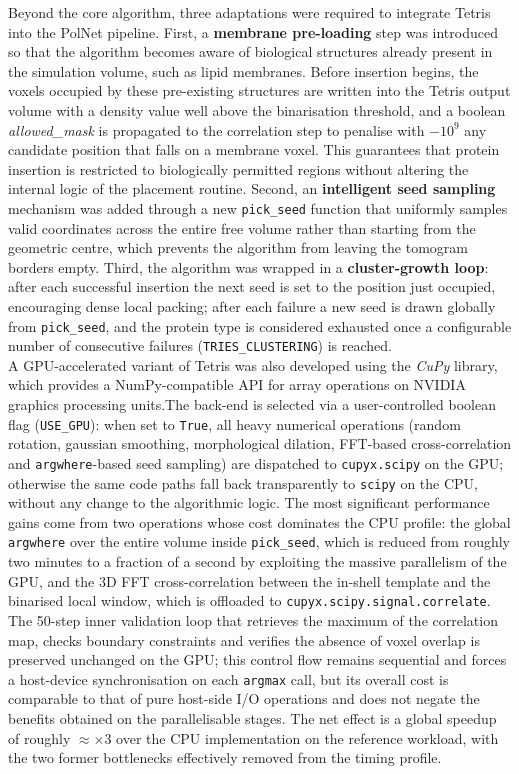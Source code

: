 Beyond the core algorithm, three adaptations were required to integrate Tetris into the
PolNet pipeline. First, a \textbf{membrane pre-loading} step was introduced so that the
algorithm becomes aware of biological structures already present in the simulation volume,
such as lipid membranes. Before insertion begins, the voxels occupied by these
pre-existing structures are written into the Tetris output volume with a density value well
above the binarisation threshold, and a boolean \textit{allowed\_mask} is propagated to the
correlation step to penalise with $-10^{9}$ any candidate position that falls on a membrane
voxel. This guarantees that protein insertion is restricted to biologically permitted regions
without altering the internal logic of the placement routine. Second, an
\textbf{intelligent seed sampling} mechanism was added through a new \texttt{pick\_seed}
function that uniformly samples valid coordinates across the entire free volume rather than
starting from the geometric centre, which prevents the algorithm from leaving the tomogram
borders empty. Third, the algorithm was wrapped in a \textbf{cluster-growth loop}: after each
successful insertion the next seed is set to the position just occupied, encouraging dense
local packing; after each failure a new seed is drawn globally from \texttt{pick\_seed}, and
the protein type is considered exhausted once a configurable number of consecutive failures
(\texttt{TRIES\_CLUSTERING}) is reached.\\

A GPU-accelerated variant of Tetris was also developed using the \textit{CuPy} library,
which provides a NumPy-compatible API for array operations on NVIDIA graphics processing
units.The back-end is selected via a user-controlled boolean flag (\texttt{USE\_GPU}): when set to \texttt{True}, all heavy numerical operations (random rotation, gaussian smoothing,
morphological dilation, FFT-based cross-correlation and \texttt{argwhere}-based seed
sampling) are dispatched to \texttt{cupyx.scipy} on the GPU; otherwise the same code paths
fall back transparently to \texttt{scipy} on the CPU, without any change to the algorithmic
logic. The most significant performance gains come from two operations whose cost dominates
the CPU profile: the global \texttt{argwhere} over the entire volume inside \texttt{pick\_seed},
which is reduced from roughly two minutes to a fraction of a second by exploiting the massive
parallelism of the GPU, and the 3D FFT cross-correlation between the in-shell template and
the binarised local window, which is offloaded to \texttt{cupyx.scipy.signal.correlate}.
The 50-step inner validation loop that retrieves the maximum of the correlation map, checks
boundary constraints and verifies the absence of voxel overlap is preserved unchanged on the
GPU; this control flow remains sequential and forces a host-device synchronisation on each
\texttt{argmax} call, but its overall cost is comparable to that of pure host-side I/O
operations and does not negate the benefits obtained on the parallelisable stages. The net
effect is a global speedup of roughly $\approx \times 3$ over the CPU implementation on the
reference workload, with the two former bottlenecks effectively removed from the timing
profile.\\

